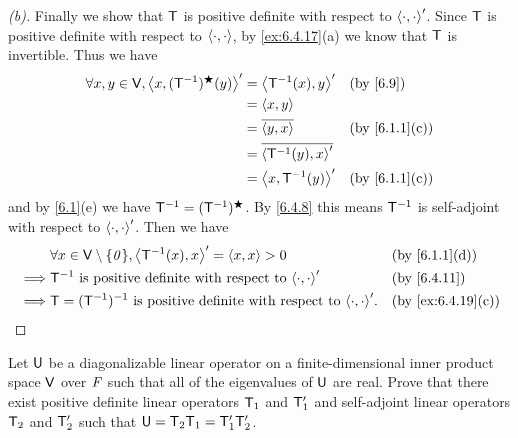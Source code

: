 \begin{proof}[(b)]
  Finally we show that \(\mathsf{T}\) is positive definite with respect to \(\left\langle\cdot, \cdot\right\rangle'\).
  Since \(\mathsf{T}\) is positive definite with respect to \(\left\langle\cdot, \cdot\right\rangle\), by \cref{ex:6.4.17}(a) we know that \(\mathsf{T}\) is invertible.
  Thus we have
  \begin{align*}
    \forall x, y \in \V, \inn{x, (\T^{-1})^{\bigstar}(y)}' & = \inn{\T^{-1}(x), y}'        &  & \by{6.9}      \\
                                                           & = \inn{x, y}                                     \\
                                                           & = \conj{\inn{y, x}}           &  & \by{6.1.1}[c] \\
                                                           & = \conj{\inn{\T^{-1}(y), x}'}                    \\
                                                           & = \inn{x, \T^{-1}(y)}'        &  & \by{6.1.1}[c]
  \end{align*}
  and by \cref{6.1}(e) we have \(\mathsf{T}^{-1} = (\mathsf{T}^{-1})^{\bigstar}\).
  By \cref{6.4.8} this means \(\mathsf{T}^{-1}\) is self-adjoint with respect to \(\left\langle\cdot, \cdot\right\rangle'\).
  Then we have
  \begin{align*}
             & \forall x \in \V \setminus \set{\zv}, \inn{\T^{-1}(x), x}' = \inn{x, x} > 0            &  & \by{6.1.1}[d]     \\
    \implies & \T^{-1} \text{ is positive definite with respect to } \inn{\cdot, \cdot}'              &  & \by{6.4.11}       \\
    \implies & \T = (\T^{-1})^{-1} \text{ is positive definite with respect to } \inn{\cdot, \cdot}'. &  & \by{ex:6.4.19}[c]
  \end{align*}
\end{proof}

\begin{ex}\label{ex:6.4.23}
  Let \(\mathsf{U}\) be a diagonalizable linear operator on a finite-dimensional inner product space \(\mathsf{V}\) over \(\mathit{F}\) such that all of the eigenvalues of \(\mathsf{U}\) are real.
  Prove that there exist positive definite linear operators \(\mathsf{T}_1\) and \(\mathsf{T}_1'\) and self-adjoint linear operators \(\mathsf{T}_2\) and \(\mathsf{T}_2'\) such that \(\mathsf{U} = \mathsf{T}_2 \mathsf{T}_1 = \mathsf{T}_1' \mathsf{T}_2'\).
\end{ex}

